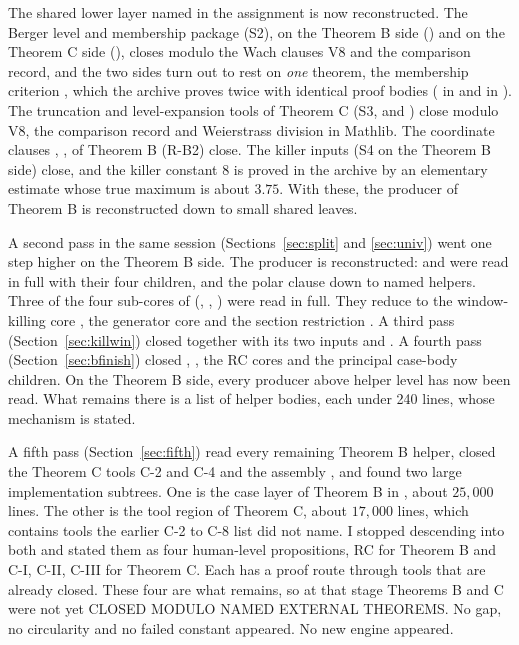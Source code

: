 \documentclass[11pt]{article}
\theoremstyle{definition}
\theoremstyle{remark}
\begin{document}
The shared lower layer named in the assignment is now reconstructed. The Berger level and membership package (S2), on the Theorem B side () and on the Theorem C side (), closes modulo the Wach clauses V8 and the comparison record, and the two sides turn out to rest on \emph{one} theorem, the membership criterion , which the archive proves twice with identical proof bodies ( in  and  in ). The truncation and level-expansion tools of Theorem C (S3,  and ) close modulo V8, the comparison record and Weierstrass division in Mathlib. The coordinate clauses , ,  of Theorem B (R-B2) close. The killer inputs (S4 on the Theorem B side) close, and the killer constant $8$ is proved in the archive by an elementary estimate whose true maximum is about $3.75$. With these, the  producer of Theorem B is reconstructed down to small shared leaves.

A second pass in the same session (Sections~\ref{sec:split} and \ref{sec:univ}) went one step higher on the Theorem B side. The  producer is reconstructed:  and  were read in full with their four children, and the polar clause down to named helpers. Three of the four sub-cores of  (, , ) were read in full. They reduce to the window-killing core , the generator core  and the section restriction . A third pass (Section~\ref{sec:killwin}) closed  together with its two inputs  and . A fourth pass (Section~\ref{sec:bfinish}) closed , , the RC cores and the principal case-body children. On the Theorem B side, every producer above helper level has now been read. What remains there is a list of helper bodies, each under 240 lines, whose mechanism is stated.

A fifth pass (Section~\ref{sec:fifth}) read every remaining Theorem B helper, closed the Theorem C tools C-2 and C-4 and the assembly , and found two large implementation subtrees. One is the case layer of Theorem B in , about $25{,}000$ lines. The other is the tool region of Theorem C, about $17{,}000$ lines, which contains tools the earlier C-2 to C-8 list did not name. I stopped descending into both and stated them as four human-level propositions, RC for Theorem B and C-I, C-II, C-III for Theorem C. Each has a proof route through tools that are already closed. These four are what remains, so at that stage Theorems B and C were not yet CLOSED MODULO NAMED EXTERNAL THEOREMS. No gap, no circularity and no failed constant appeared. No new engine appeared.
\end{document}
